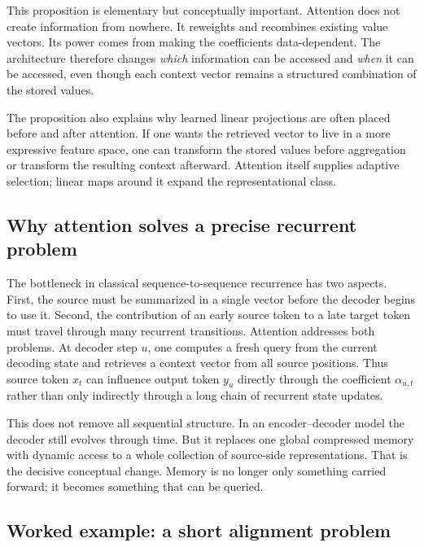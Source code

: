 \medskip

This proposition is elementary but conceptually important.
Attention does not create information from nowhere.
It reweights and recombines existing value vectors.
Its power comes from making the coefficients data-dependent.
The architecture therefore changes \emph{which} information can be accessed and \emph{when} it can be accessed, even though each context vector remains a structured combination of the stored values.

\begin{remark}
The proposition also explains why learned linear projections are often placed before and after attention.
If one wants the retrieved vector to live in a more expressive feature space, one can transform the stored values before aggregation or transform the resulting context afterward.
Attention itself supplies adaptive selection; linear maps around it expand the representational class.
\end{remark}

\subsection*{Why attention solves a precise recurrent problem}

The bottleneck in classical sequence-to-sequence recurrence has two aspects.
First, the source must be summarized in a single vector before the decoder begins to use it.
Second, the contribution of an early source token to a late target token must travel through many recurrent transitions.
Attention addresses both problems.
At decoder step $u$, one computes a fresh query from the current decoding state and retrieves a context vector from all source positions.
Thus source token $x_t$ can influence output token $y_u$ directly through the coefficient $\alpha_{u,t}$ rather than only indirectly through a long chain of recurrent state updates.

\medskip

This does not remove all sequential structure.
In an encoder--decoder model the decoder still evolves through time.
But it replaces one global compressed memory with dynamic access to a whole collection of source-side representations.
That is the decisive conceptual change.
Memory is no longer only something carried forward; it becomes something that can be queried.

\subsection*{Worked example: a short alignment problem}


